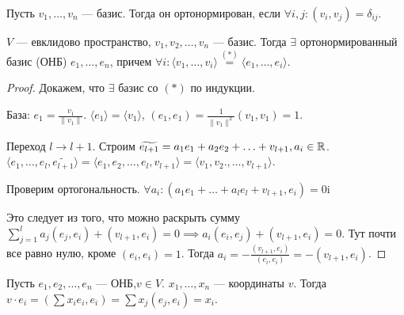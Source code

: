 \begin{definition}
    Пусть $v_1, \ldots, v_n$ --- базис. Тогда он ортонормирован, если $\forall i,j\!: (v_i, v_j) = \delta_{ij}$.
\end{definition}
\begin{theorem}
    $V$ --- евклидово пространство,  $v_1, v_2, \ldots, v_n$ --- базис.
    Тогда $\exists$ ортонормированный базис (ОНБ)  $e_1, \ldots, e_n$, причем $\forall i\!: \langle v_1, \ldots, v_i\rangle \overset{(*)}{=} \langle e_1, \ldots, e_i\rangle$.
\end{theorem}
\begin{proof}
    Докажем, что $\exists$ базис со  $(*)$ по индукции.

    База: $e_1 = \frac{v_1}{\|v_1\|}$. $\langle e_1\rangle = \langle v_1\rangle$, $(e_1, e_1) = \frac{1}{\|v_1\|^2} (v_1, v_1) = 1$.

    Переход $l \to l+1$.  Строим  $\widetilde{e_{l+1}} = a_1e_1 + a_2e_2 + \ldots + v_{l+1}, a_i \in \mathbb{R}$. $\langle e_1, \ldots, e_l, \widetilde{e_{l+1}} \rangle = \langle e_1, e_2, \ldots, e_l, v_{l+1} \rangle = \langle v_1, v_2., \ldots, v_{l+1}\rangle$.

    Проверим ортогональность. $\forall a_i\!: (a_1e_1 + \ldots + a_le_l + v_{l+1}, e_i) = 0$i

    Это следует из того, что можно раскрыть сумму $\sum\limits_{j=1}^l a_j(e_j, e_i) + (v_{l+1}, e_i) = 0 \implies a_i(e_i, e_j) + (v_{l+1}, e_i) = 0$. Тут почти все равно нулю, кроме  $(e_i, e_i) = 1$. Тогда  $a_i = - \frac{(v_{l+1}, e_i)}{(e_i, e_i)} = -(v_{l+1}, e_i)$.
\end{proof}
\begin{remark}
    Пусть $e_1, e_2, \ldots, e_n$ --- ОНБ,$v \in V$.  $x_1, \ldots, x_n$ --- координаты $v$. Тогда  $v\cdot e_i = (\sum x_i e_i, e_i) = \sum x_j(e_j, e_i) = x_i$.
\end{remark}
